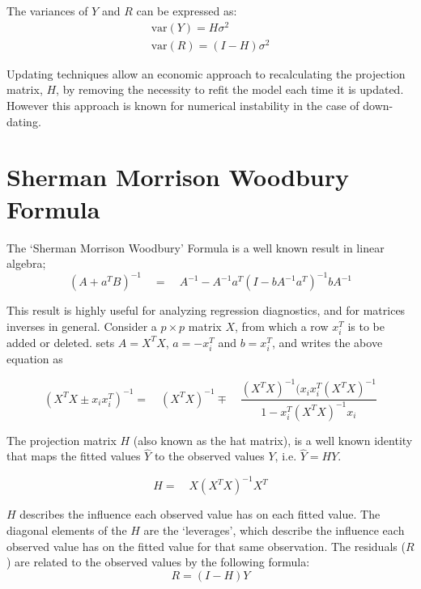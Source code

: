 The variances of $Y$ and $R$ can be expressed as:
\begin{eqnarray}
\mbox{var}(Y) = H\sigma^{2} \nonumber\\
\mbox{var}(R) = (I-H)\sigma^{2}
\end{eqnarray}

Updating techniques allow an economic approach to recalculating
the projection matrix, $H$, by removing the necessity to refit the
model each time it is updated. However this approach is known for
numerical instability in the case of down-dating.

\section{Sherman Morrison Woodbury Formula} %

The `Sherman Morrison Woodbury' Formula is a well known result in
linear algebra;
\begin{equation}
(A+a^{T}B)^{-1} \quad = \quad A^{-1}-
A^{-1}a^{T}(I-bA^{-1}a^{T})^{-1}bA^{-1}
\end{equation}

This result is highly useful for analyzing regression diagnostics,
and for matrices inverses in general. Consider a $p \times p$
matrix $X$, from which a row $x_{i}^{T}$ is to be added or
deleted. \citet{CookWeisberg} sets $A = X^{T}X$, $a=-x_{i}^{T}$
and $b=x_{i}^{T}$, and writes the above equation as

\begin{equation}
(X^{T}X \pm x_{i}x_{i}^{T})^{-1} = \quad(X^{T}X )^{-1} \mp \quad
\frac{(X^{T}X)^{-1}(x_{i}x_{i}^{T}(X^{T}X)^{-1}}{1-x_{i}^{T}(X^{T}X)^{-1}x_{i}}
\end{equation}

The projection matrix $H$ (also known as the hat matrix), is a
well known identity that maps the fitted values $\hat{Y}$ to the
observed values $Y$, i.e. $\hat{Y} = HY$.

\begin{equation}
H =\quad X(X^{T}X)^{-1}X^{T}
\end{equation}

$H$ describes the influence each observed value has on each fitted value. The diagonal elements of the $H$ are the `leverages', which describe the influence each observed value has on the fitted value for that same observation. The residuals ($R$) are related to the observed values by the following formula:
\begin{equation}
R = (I-H)Y
\end{equation}

